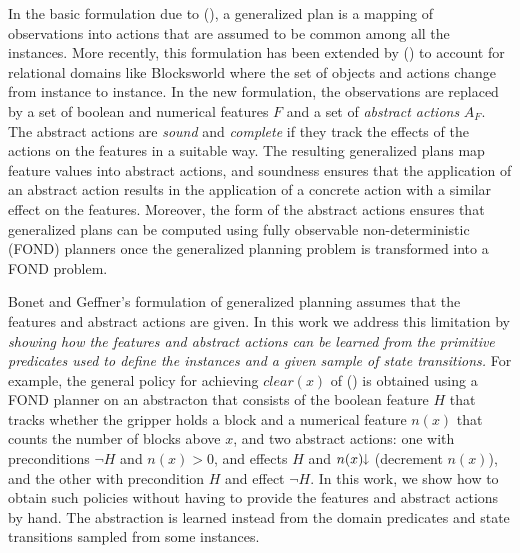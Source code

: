 \documentclass[letterpaper]{article} %
\newcommand{\Omit}[1]{}
\newcommand{\citeay}[1]{\citeauthor{#1} (\citeyear{#1})}
\newcommand{\mminus}{\hspace{-.05em}\raisebox{.15ex}{\footnotesize$\downarrow$}}
\begin{document}
In the basic formulation due  to \citeay{hu:generalized}, a generalized plan
is a mapping of observations into actions that are assumed to be common
among  all the instances. More recently, this formulation has been extended by
\citeay{bonet:ijcai2018} to account for relational domains like Blocksworld  where the set of
objects and  actions change from instance to instance.
In the new formulation, the observations  are replaced by  a set of boolean
and numerical features $F$ and a set of \emph{abstract actions} $A_F$.
The  abstract actions are  \emph{sound} and \emph{complete} if they track the
effects  of the actions on  the features in a suitable way.
The resulting generalized plans  map feature values into abstract actions, and soundness
ensures that the application  of an   abstract action  results in the application of
a concrete action with a similar  effect  on  the features. Moreover, the form of the abstract actions
ensures that generalized plans can be computed using fully observable non-deterministic (FOND) planners
once the generalized planning problem is transformed into a FOND problem.

\Omit{
Abstract actions can increase or decrease numerical variables  $n$
associated with the numerical features (e.g., number of blocks above $x$), and while
increments  are transformed into deterministic propositional  effects $n > 0$ where $n > 0$ is
the negation of the proposition $n=0$, decrements  are  transformed  into
non-deterministic (disjunctive)  propositional effects $n > 0 \, | \, n=0$. 
}

Bonet and Geffner's  formulation of generalized planning assumes that the
features and abstract actions are given. In this work we address this limitation
by  \emph{showing  how the features and abstract actions  can be learned from
the primitive predicates used to define the instances and a given sample of state transitions.}
For example,  the general policy for achieving $clear(x)$ of \citeay{bonet:ijcai2018}
is obtained using a FOND planner on an abstracton that consists of the boolean
feature $H$ that tracks whether the gripper holds a block and a numerical feature
$n(x)$ that counts the number of blocks above $x$, and two abstract actions:
one with preconditions $\neg H$ and $n(x) > 0$, and effects $H$ and $n(x)\mminus$
(decrement $n(x)$), and the other with precondition $H$ and effect $\neg H$.
In this work, we show how to obtain such policies without having to provide the
features and abstract actions by hand.  The abstraction is learned instead from
the domain predicates and state transitions sampled from some instances. 
\end{document}
